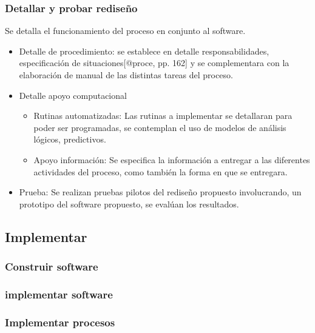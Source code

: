 \documentclass[
]{article}
\providecommand{\tightlist}{%
  \setlength{\itemsep}{0pt}\setlength{\parskip}{0pt}}
\begin{document}
\hypertarget{detallar-y-probar-rediseuxf1o}{%
\subsubsection{Detallar y probar
rediseño}\label{detallar-y-probar-rediseuxf1o}}

Se detalla el funcionamiento del proceso en conjunto al software.

\begin{itemize}
\tightlist
\item
  Detalle de procedimiento: se establece en detalle responsabilidades,
  especificación de situaciones{[}@proce, pp. 162{]} y se complementara
  con la elaboración de manual de las distintas tareas del proceso.
\item
  Detalle apoyo computacional

  \begin{itemize}
  \tightlist
  \item
    Rutinas automatizadas: Las rutinas a implementar se detallaran para
    poder ser programadas, se contemplan el uso de modelos de análisis
    lógicos, predictivos.
  \item
    Apoyo información: Se especifica la información a entregar a las
    diferentes actividades del proceso, como también la forma en que se
    entregara.
  \end{itemize}
\item
  Prueba: Se realizan pruebas pilotos del rediseño propuesto
  involucrando, un prototipo del software propuesto, se evalúan los
  resultados.
\end{itemize}

\hypertarget{implementar}{%
\subsection{Implementar}\label{implementar}}

\hypertarget{construir-software}{%
\subsubsection{Construir software}\label{construir-software}}

\hypertarget{implementar-software}{%
\subsubsection{implementar software}\label{implementar-software}}

\hypertarget{implementar-procesos}{%
\subsubsection{Implementar procesos}\label{implementar-procesos}}
\end{document}
